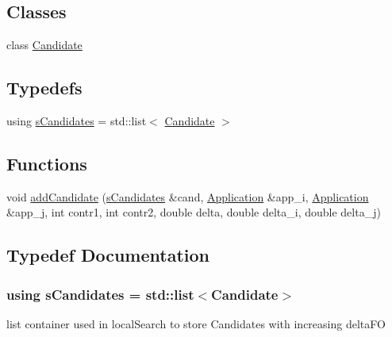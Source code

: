 \subsection*{Classes}
\begin{DoxyCompactItemize}
\item 
class \hyperlink{classCandidate}{Candidate}
\end{DoxyCompactItemize}
\subsection*{Typedefs}
\begin{DoxyCompactItemize}
\item 
using \hyperlink{candidates_8hh_af1ec7d668b0f7361dc7e1e1da5c4ce7d}{s\-Candidates} = std\-::list$<$ \hyperlink{classCandidate}{Candidate} $>$
\end{DoxyCompactItemize}
\subsection*{Functions}
\begin{DoxyCompactItemize}
\item 
void \hyperlink{candidates_8hh_a0dead9d126fdc270fa4692dc0e4671e2}{add\-Candidate} (\hyperlink{candidates_8hh_af1ec7d668b0f7361dc7e1e1da5c4ce7d}{s\-Candidates} \&cand, \hyperlink{classApplication}{Application} \&app\-\_\-i, \hyperlink{classApplication}{Application} \&app\-\_\-j, int contr1, int contr2, double delta, double delta\-\_\-i, double delta\-\_\-j)
\end{DoxyCompactItemize}


\subsection{Typedef Documentation}
\hypertarget{candidates_8hh_af1ec7d668b0f7361dc7e1e1da5c4ce7d}{
\subsubsection[{s\-Candidates}]{\setlength{\rightskip}{0pt plus 5cm}using {\bf s\-Candidates} =  std\-::list$<${\bf Candidate}$>$}}\label{candidates_8hh_af1ec7d668b0f7361dc7e1e1da5c4ce7d}
list container used in local\-Search to store Candidates with increasing delta\-F\-O 


